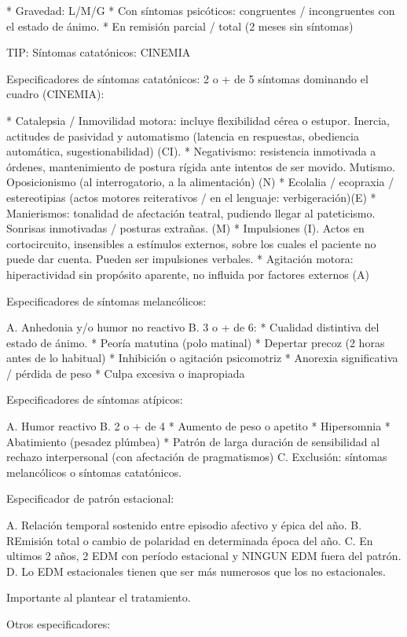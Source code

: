 * Gravedad: L/M/G
* Con síntomas psicóticos: congruentes / incongruentes con el estado de ánimo.
* En remisión parcial / total (2 meses sin síntomas)

TIP: Síntomas catatónicos: CINEMIA

Especificadores de síntomas catatónicos: 2 o + de 5 síntomas dominando el cuadro (CINEMIA):

* Catalepsia / Inmovilidad motora: incluye flexibilidad cérea o estupor. Inercia, actitudes de pasividad y automatismo (latencia en respuestas, obediencia automática, sugestionabilidad) (CI).
* Negativismo: resistencia inmotivada a órdenes, mantenimiento de postura rígida ante intentos de ser movido. Mutismo. Oposicionismo (al interrogatorio, a la alimentación) (N)
* Ecolalia / ecopraxia / estereotipias (actos motores reiterativos / en el lenguaje: verbigeración)(E)
* Manierismos: tonalidad de afectación teatral, pudiendo llegar al pateticismo. Sonrisas inmotivadas / posturas extrañas. (M)
* Impulsiones (I). Actos en cortocircuito, insensibles a estímulos externos, sobre los cuales el paciente no puede dar cuenta. Pueden ser impulsiones verbales.
* Agitación motora: hiperactividad sin propósito aparente, no influida por factores externos (A)

Especificadores de síntomas melancólicos:

A. Anhedonia y/o humor no reactivo
B. 3 o + de 6:
* Cualidad distintiva del estado de ánimo.
* Peoría matutina (polo matinal)
* Depertar precoz (2 horas antes de lo habitual)
* Inhibición o agitación psicomotriz
* Anorexia significativa / pérdida de peso
* Culpa excesiva o inapropiada

Especificadores de síntomas atípicos:

A. Humor reactivo
B. 2 o + de 4
* Aumento de peso o apetito
* Hipersomnia
* Abatimiento (pesadez plúmbea)
* Patrón de larga duración de sensibilidad al rechazo interpersonal (con afectación de pragmatismos)
C. Exclusión: síntomas melancólicos o síntomas catatónicos.

Especificador de patrón estacional:

A. Relación temporal sostenido entre episodio afectivo y épica del año.
B. REmisión total o cambio de polaridad en determinada época del año.
C. En ultimos 2 años, 2 EDM con período estacional y NINGUN EDM fuera del patrón.
D. Lo EDM estacionales tienen que ser más numerosos que los no estacionales.

Importante al plantear el tratamiento.

Otros especificadores:

